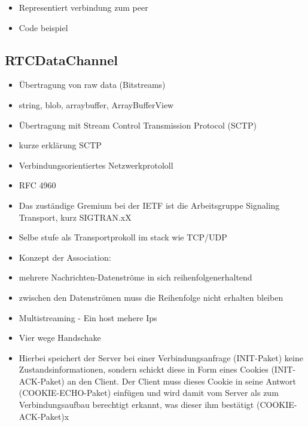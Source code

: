 \begin{itemize}
	\item Representiert verbindung zum peer
	\item Code beispiel
\end{itemize}

\subsection{RTCDataChannel}

\begin{itemize}
	\item Übertragung von raw data (Bitstreams)
	\item string, blob, arraybuffer, ArrayBufferView
	\item Übertragung mit Stream Control Transmission Protocol (SCTP)
	\item kurze erklärung SCTP
	\item 	Verbindungsorientiertes Netzwerkprotololl
	\item 	 RFC 4960
	\item 	Das zuständige Gremium bei der IETF ist die Arbeitsgruppe Signaling Transport, kurz SIGTRAN.xX
	\item 	Selbe stufe als Transportprokoll im stack wie TCP/UDP
	\item 	Konzept der Association: 
	\item 		mehrere Nachrichten-Datenströme in sich reihenfolgenerhaltend
	\item 		zwischen den Datenströmen muss die Reihenfolge nicht erhalten bleiben
	\item 	Multistreaming - Ein host mehere Ips
	\item 	Vier wege Handschake
	\item 		Hierbei speichert der Server bei einer Verbindungsanfrage (INIT-Paket) keine Zustandsinformationen, sondern schickt diese in Form eines Cookies (INIT-ACK-Paket) an den Client. Der Client muss dieses Cookie in seine Antwort (COOKIE-ECHO-Paket) einfügen und wird damit vom Server als zum Verbindungsaufbau berechtigt erkannt, was dieser ihm bestätigt (COOKIE-ACK-Paket)x
\end{itemize}


